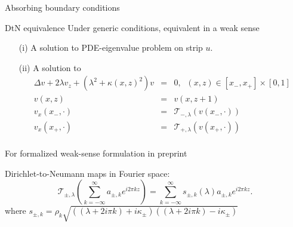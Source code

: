 \documentclass[10pt]{beamer}
\begin{document}
\begin{frame}{Absorbing boundary conditions}
\begin{block}{DtN equivalence}
\small Under generic conditions, equivalent in a weak sense
\begin{itemize}
  \item[(i)] A solution to PDE-eigenvalue problem on strip $u$. \pause
\item[(ii)] A solution to 
\vspace{-0.1cm}\small \begin{eqnarray*}
\Delta v+2\lambda v_z+(\lambda^2+\kappa(x,z)^2)v&=&0,
\;\; (x,z)\in[x_-,x_+]\times [0,1]\\
  v(x,z)&=&v(x,z+1)\\
  v_x(x_-,\cdot)&=&\mathcal{T}_{-,\lambda}(v(x_-,\cdot))\\
  v_x(x_+,\cdot)&=&\mathcal{T}_{+,\lambda}(v(x_+,\cdot))\\
\end{eqnarray*}\pause
\end{itemize}\vspace{-0.9cm}
\hfill For formalized weak-sense formulation in preprint\pause 
\end{block}
\small Dirichlet-to-Neumann maps in Fourier space:
\[ 
\mathcal{T}_{\pm,\lambda}
\left(\sum_{k=-\infty}^\infty a_{\pm,k}e^{i2\pi kz}\right)
=
\sum_{k=-\infty}^\infty s_{\pm,k}(\lambda)a_{\pm,k}e^{i2\pi kz}.
\]
where $s_{\pm,k}=\rho_k \sqrt{((\lambda+2i\pi k)+i\kappa_\pm)((\lambda+2i\pi k)-i\kappa_\pm)}$ \pause\\ 
\begin{center}
\end{center}
\end{frame}
\end{document}
